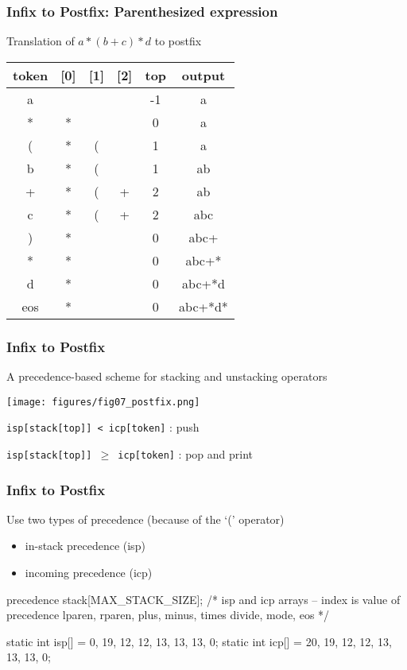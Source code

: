 \documentclass[newPxFont,sthlmFooter,nooffset]{beamer}
\begin{document}
\begin{frame}[t]
  \frametitle{Infix to Postfix: Parenthesized expression}

Translation of $a*(b+c)*d$ to postfix
  \begin{center}
    \begin{tabular}{c | c c c | c | c}
      token & [0] & [1] & [2] & top & output \\ \hline
                  a &   &   &   & -1 & a \\
      * & * &   &   & 0 & a \\
      ( & * & ( &   & 1 & a \\
      b & * & ( &   & 1 & ab \\
      + & * & ( & + & 2 & ab \\
      c & * & ( & + & 2 & abc \\
      ) & * &   &   & 0 & abc+\\
      * & * &   &   & 0 & abc+*\\
      d & * &   &   & 0 & abc+*d\\
   eos & * &   &   & 0 & abc+*d*\\
    \end{tabular}
  \end{center}
\end{frame}

\begin{frame}[t]
  \frametitle{Infix to Postfix}
A precedence-based scheme for stacking and unstacking operators
\begin{center}
  \texttt{[image: figures/fig07\_postfix.png]}
\end{center}
\texttt{isp[stack[top]] < icp[token]} : push

\texttt{isp[stack[top]] $\geq$ icp[token]} : pop and print

\end{frame}

\begin{frame}[t, fragile]
  \frametitle{Infix to Postfix}
Use two types of precedence (because of the `(' operator)
\begin{itemize}
\item in-stack precedence (isp)
\item incoming precedence (icp)
\end{itemize}

\begin{ncodedef}
precedence stack[MAX_STACK_SIZE];
/* isp and icp arrays 
   -- index is value of precedence 
      lparen, rparen, plus, minus, 
      times divide, mode, eos */

static int isp[] = {0, 19, 12, 12, 13, 13, 13, 0};
static int icp[] = {20, 19, 12, 12, 13, 13, 13, 0};
\end{ncodedef}
\end{frame}
\end{document}
